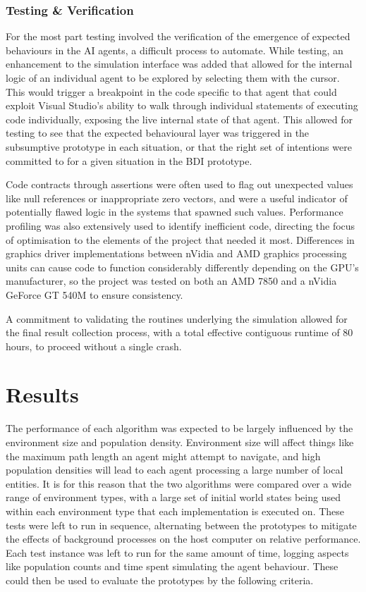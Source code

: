 \documentclass[a4paper,12pt]{article}
\begin{document}
\subsubsection{Testing \& Verification}
For the most part testing involved the verification of the emergence of expected behaviours in the AI agents, a difficult process to automate. While testing, an enhancement to the simulation interface was added that allowed for the internal logic of an individual agent to be explored by selecting them with the cursor. This would trigger a breakpoint in the code specific to that agent that could exploit Visual Studio's ability to walk through individual statements of executing code individually, exposing the live internal state of that agent. This allowed for testing to see that the expected behavioural layer was triggered in the subsumptive prototype in each situation, or that the right set of intentions were committed to for a given situation in the BDI prototype.

Code contracts through assertions were often used to flag out unexpected values like null references or inappropriate zero vectors, and were a useful indicator of potentially flawed logic in the systems that spawned such values. Performance profiling was also extensively used to identify inefficient code, directing the focus of optimisation to the elements of the project that needed it most. Differences in graphics driver implementations between nVidia and AMD graphics processing units can cause code to function considerably differently depending on the GPU's manufacturer, so the project was tested on both an AMD 7850 and a nVidia GeForce GT 540M to ensure consistency.

A commitment to validating the routines underlying the simulation allowed for the final result collection process, with a total effective contiguous runtime of 80 hours, to proceed without a single crash.

\section{Results}
\noindent
The performance of each algorithm was expected to be largely influenced by the environment size and population density. Environment size will affect things like the maximum path length an agent might attempt to navigate, and high population densities will lead to each agent processing a large number of local entities. It is for this reason that the two algorithms were compared over a wide range of environment types, with a large set of initial world states being used within each environment type that each implementation is executed on. These tests were left to run in sequence, alternating between the prototypes to mitigate the effects of background processes on the host computer on relative performance. Each test instance was left to run for the same amount of time, logging aspects like population counts and time spent simulating the agent behaviour. These could then be used to evaluate the prototypes by the following criteria.
\end{document}
